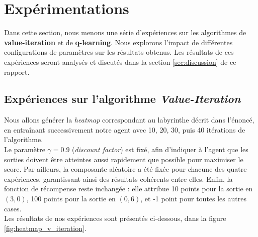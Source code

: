 \documentclass{article}
\begin{document}
\section{Expérimentations}
\label{sec:experimentations}

\noindent Dans cette section, nous menons une série d'expériences sur les algorithmes de \textbf{value-iteration} et de \textbf{q-learning}. Nous explorons l’impact de différentes configurations de paramètres sur les résultats obtenus. Les résultats de ces expériences seront analysés et discutés dans la section \ref{sec:discussion} de ce rapport.

\subsection{Expériences sur l'algorithme \textit{Value-Iteration}}

\noindent Nous allons générer la \textit{heatmap} correspondant au labyrinthe décrit dans l'énoncé, en entraînant successivement notre agent avec 10, 20, 30, puis 40 itérations de l'algorithme. \\

\noindent Le paramètre $\gamma=0.9$ (\textit{discount factor}) est fixé, afin d'indiquer à l'agent que les sorties doivent être atteintes aussi rapidement que possible pour maximiser le score. Par ailleurs, la composante aléatoire a été fixée pour chacune des quatre expériences, garantissant ainsi des résultats cohérents entre elles. Enfin, la fonction de récompense reste inchangée : elle attribue 10 points pour la sortie en $(3, 0)$, 100 points pour la sortie en $(0, 6)$, et -1 point pour toutes les autres cases. \\

\noindent Les résultats de nos expériences sont présentés ci-dessous, dans la figure \ref{fig:heatmap_v_iteration}.
\end{document}

